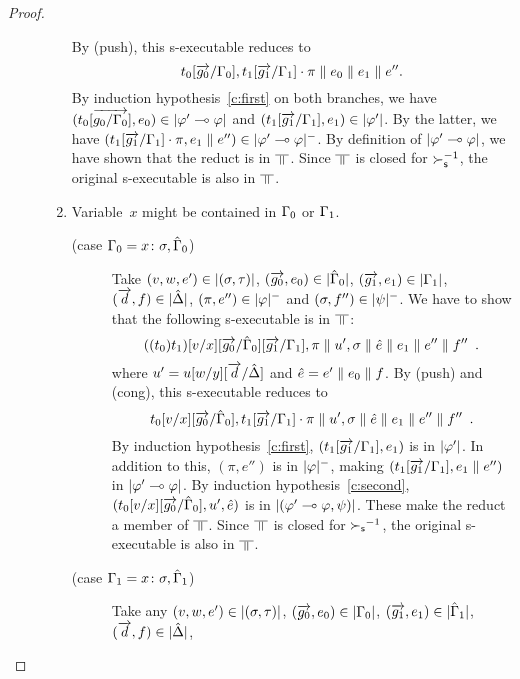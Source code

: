 \begin{proof}
\begin{description}
\begin{enumerate}[label=\textit{(\arabic{*})}]
\[	       \]
	       By (push), this s-executable reduces to
	       \[
		t_0[\overrightarrow{g_0}/\Gamma_0], t_1[\overrightarrow{g_1}/\Gamma_1]\cdot \pi
	       \parallel {e_0}\parallel {e_1}\parallel e''.
	       \]
	       By induction hypothesis~\ref{c:first} on both branches,
	       we have $(t_0[\overrightarrow{g_0/\Gamma_0}],
	       {e_0})\in|{\varphi'\multimap\varphi}|$
	       and
	       $(t_1[\overrightarrow{g_1}/\Gamma_1],{e_1})\in|{\varphi'}|$.
	       By the latter, we have $(t_1[\overrightarrow{g_1}/\Gamma_1]\cdot\pi,
	       {e_1}\parallel e'')\in|{\varphi'\multimap\varphi}|^-$.
	       By definition of $|{\varphi'\multimap\varphi}|$, we have shown that the
	       reduct is in $\bbot$.
	       Since $\bbot$ is closed for $\succ_{\mathsf s}^{-1}$,
	       the original s-executable is also in $\bbot$.
	 \item Variable~$x$ might be contained in $\Gamma_0$ or $\Gamma_1$.
	       \begin{description}
		\item[(case $\Gamma_0 = {x} \colon{\sigma},\hat{\Gamma}_0$)]
		     Take
		     $(v,w,e')\in|{(\sigma,\tau)}|$,
		     $(\overrightarrow{g_0},{e_0})\in|{\hat{\Gamma}_0}|$,
		     $(\overrightarrow{g_1},{e_1})\in|{\Gamma_1}|$,
		     $(\overrightarrow{d},{f})\in|{\hat{\Delta}}|$,
		     $(\pi,e'')\in|{\varphi}|^-$ and
		     $(\sigma,f'')\in|{\psi}|^-$.
		     We have to show that the following s-executable is in
		     $\bbot$:
		     \[
		     ((t_0)t_1)[v/x][\overrightarrow{g_0}/\hat{\Gamma}_0][\overrightarrow{g_1}/\Gamma_1],\pi\parallel
		     u' ,\sigma\parallel \hat e\parallel {{e_1}}\parallel
		     {e''}\parallel{f''}\enspace.
		     \]
		     where
		     $u' = u[w/y][\overrightarrow{d}/\hat{\Delta}]$ and
		     $\hat e= e'\parallel {e_0}\parallel {f}$.
		     By (push) and (cong), this s-executable reduces to
		     \[
		     t_0[v/x][\overrightarrow{g_0}/\hat{\Gamma}_0],
		     t_1[\overrightarrow{g_1}/\Gamma_1]\cdot\pi
		     \parallel
		     u' ,\sigma\parallel \hat e\parallel {{e_1}}\parallel
		     {e''}\parallel{f''}\enspace.
		     \]
		     By induction hypothesis~\ref{c:first},
		     $(t_1[\overrightarrow{g_1}/\Gamma_1],{e_1})$ is in $|{\varphi'}|$.
		     In addition to this, $(\pi,e'')$ is in $|{\varphi}|^-$,
		     making $(t_1[\overrightarrow{g_1}/\Gamma_1], {e_1}\parallel e'')$ in
		     $|{\varphi'\multimap\varphi}|$.
		     By induction hypothesis~\ref{c:second},
		     $(t_0[v/x][\overrightarrow{g_0}/\hat{\Gamma}_0], u', \hat e)$ is in
		     $|{(\varphi'\multimap\varphi,\psi)}|$.
		     These make the reduct a member of $\bbot$.
		     Since $\bbot$ is closed for ${\succ_{\mathsf s}}^{-1}$, the original
		     s-executable is also in $\bbot$.
		\item[(case $\Gamma_1 = {x} \colon{\sigma},\hat{\Gamma}_1$)]
		     Take any
		     $(v,w,e')\in|{(\sigma,\tau)}|$,
		     $(\overrightarrow{g_0},{e_0})\in|{\Gamma_0}|$,
		     $(\overrightarrow{g_1},{e_1})\in|{\hat{\Gamma}_1}|$,
		     $(\overrightarrow{d},{f})\in|{\hat{\Delta}}|$,

\end{description}
\end{enumerate}
\end{description}
\end{proof}
